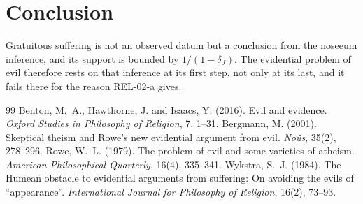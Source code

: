 \documentclass{situationist-preprint}
\begin{document}
\section{Conclusion}

Gratuitous suffering is not an observed datum but a conclusion from the noseeum inference, and its support is bounded by $1/(1-\delta_J)$. The evidential problem of evil therefore rests on that inference at its first step, not only at its last, and it fails there for the reason REL-02-a gives.

\begin{thebibliography}{99}\small
{} Benton, M.~A., Hawthorne, J. and Isaacs, Y. (2016). Evil and evidence. \emph{Oxford Studies in Philosophy of Religion}, 7, 1--31.
 Bergmann, M. (2001). Skeptical theism and Rowe's new evidential argument from evil. \emph{No\^us}, 35(2), 278--296.
 Rowe, W.~L. (1979). The problem of evil and some varieties of atheism. \emph{American Philosophical Quarterly}, 16(4), 335--341.
 Wykstra, S.~J. (1984). The Humean obstacle to evidential arguments from suffering: On avoiding the evils of \enquote{appearance}. \emph{International Journal for Philosophy of Religion}, 16(2), 73--93.
\end{thebibliography}
\end{document}
